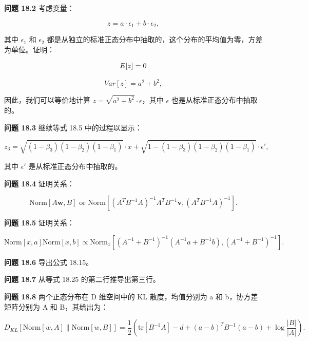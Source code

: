 \documentclass[lang=cn,newtx,10pt,scheme=chinese]{elegantbook}
\begin{document}
\textbf{问题 18.2} 考虑变量：

\begin{equation}
z = a \cdot \epsilon_1 + b \cdot \epsilon_2, 
\end{equation}

其中 \(\epsilon_1\) 和 \(\epsilon_2\) 都是从独立的标准正态分布中抽取的，这个分布的平均值为零，方差为单位。证明：

\begin{equation}
E[z] = 0 \notag
\end{equation}

\begin{equation}
Var[z] = a^2 + b^2, 
\end{equation}

因此，我们可以等价地计算 \(z = \sqrt{a^2 + b^2} \cdot \epsilon\)，其中 \(\epsilon\) 也是从标准正态分布中抽取的。

\textbf{问题 18.3} 继续等式 18.5 中的过程以显示：

\begin{equation}
z_3 = \sqrt{(1 - \beta_3)(1 - \beta_2)(1 - \beta_1)} \cdot x + \sqrt{1 - (1 - \beta_3)(1 - \beta_2)(1 - \beta_1)} \cdot \epsilon', 
\end{equation}

其中 \(\epsilon'\) 是从标准正态分布中抽取的。

\textbf{问题 18.4} 证明关系：

\begin{equation}
\text{Norm}[A\mathbf{w}, B] \text{ or Norm} \left[ (A^T B^{-1} A)^{-1} A^T B^{-1}\mathbf{v}, (A^T B^{-1} A)^{-1} \right]. 
\end{equation}

\textbf{问题 18.5} 证明关系：

\begin{equation}
\text{Norm}[x, a] \text{Norm}[x, b] \propto \text{Norm}_x \left[ (A^{-1} + B^{-1})^{-1}(A^{-1}a + B^{-1}b), (A^{-1} + B^{-1})^{-1} \right]. 
\end{equation}

\textbf{问题 18.6} 导出公式 18.15。

\textbf{问题 18.7} 从等式 18.25 的第二行推导出第三行。

\textbf{问题 18.8} 两个正态分布在 D 维空间中的 KL 散度，均值分别为 a 和 b，协方差矩阵分别为 A 和 B，其给出为：

\begin{equation}
D_{KL} [\text{Norm}[w, A] \| \text{Norm}[w, B]] = \frac{1}{2} \left( \text{tr}[B^{-1}A] - d + (a - b)^T B^{-1}(a - b) + \log \frac{|B|}{|A|} \right). 
\end{equation}
\end{document}
